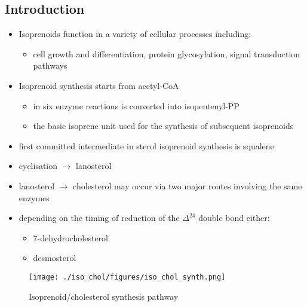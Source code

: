 \documentclass{scrartcl}
\begin{document}
\subsection{Introduction}
\label{sec:org78cf2e4}
\begin{itemize}
\item Isoprenoids function in a variety of cellular processes including:
\begin{itemize}
\item cell growth and differentiation, protein glycosylation, signal
transduction pathways
\end{itemize}
\item Isoprenoid synthesis starts from acetyl-CoA
\begin{itemize}
\item in six enzyme reactions is converted into isopentenyl-PP
\item the basic isoprene unit used for the synthesis of subsequent
isoprenoids
\end{itemize}
\item first committed intermediate in sterol isoprenoid synthesis is
squalene
\item cyclisation \(\to\) lanosterol
\item lanosterol \(\to\) cholesterol may occur via two major routes involving
the same enzymes
\item depending on the timing of reduction of the \(\Delta^{\text{24}}\) double bond either:
\begin{itemize}
\item 7-dehydrocholesterol
\item desmosterol
\end{itemize}
\end{itemize}


\begin{figure}[htbp]
\centering
\texttt{[image: ./iso\_chol/figures/iso\_chol\_synth.png]}
\caption{\label{fig:orga27a75c}
Isoprenoid/cholesterol synthesis pathway}
\end{figure}
\end{document}

